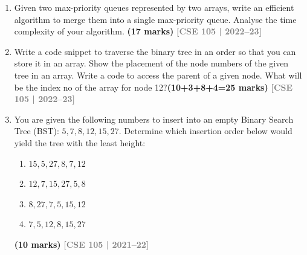 \documentclass[12pt,a3paper]{article}
\newcommand{\yr}[1]{\hfill\textcolor{gray}{\small\textbf{[#1]}}}
\newcommand{\mk}[1]{\textcolor{orange!70!black}{\small\textbf{(#1 marks)}}}
\begin{document}
\begin{enumerate}
\item Given two max-priority queues represented by two arrays, write an efficient
algorithm to merge them into a single max-priority queue. Analyse the time
complexity of your algorithm. \mk{17}
\yr{CSE 105 | 2022--23}

\item Write a code snippet to traverse the binary tree in an order so that you can store it in an array. Show the placement of the node numbers of the given tree in an array. Write a code to access the parent of a given node. What will be the index no of the array for node 12?\mk{10+3+8+4=25}
\yr{CSE 105 | 2022--23}

\begin{center}
\end{center}

\item You are given the following numbers to insert into an empty Binary Search Tree (BST): $5, 7, 8, 12, 15, 27$. Determine which insertion order below would yield the tree with the least height:
\begin{enumerate}
  \item $15, 5, 27, 8, 7, 12$
  \item $12, 7, 15, 27, 5, 8$
  \item $8, 27, 7, 5, 15, 12$
  \item $7, 5, 12, 8, 15, 27$
\end{enumerate}
\mk{10}
\yr{CSE 105 | 2021--22}



\end{enumerate}
\end{document}
